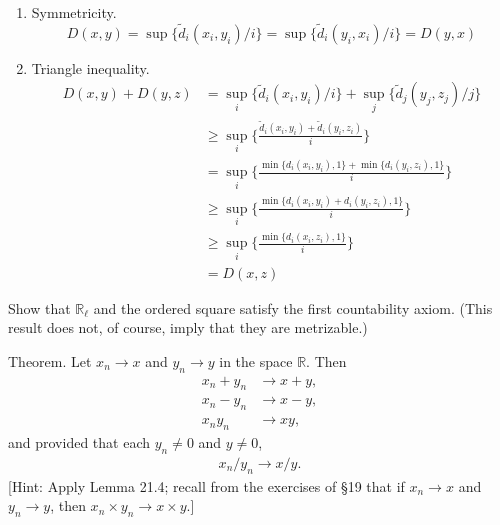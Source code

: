 \begin{solution}
\begin{enumerate}
    \item Symmetricity. 
      \begin{equation}
        D(x, y) = \sup\{\tilde{d}_i (x_i, y_i) / i \} = \sup\{\tilde{d}_i (y_i, x_i) / i \} = D(y, x)
      \end{equation}

    \item Triangle inequality. 
      \begin{align}
        D(x, y) + D(y, z) & = \sup_i \{\tilde{d}_i (x_i, y_i) / i \} + \sup_j \{\tilde{d}_j (y_j, z_j) / j \} \\
                          & \geq \sup_i \bigg\{ \frac{\tilde{d}_i (x_i, y_i) + \tilde{d}_i (y_i, z_i)}{i} \bigg\} \\
                          & = \sup_i \bigg\{ \frac{ \min\{d_i (x_i, y_i), 1\} + \min\{ d_i (y_i, z_i), 1\}}{i} \bigg\} \\
                          & \geq \sup_i \bigg\{ \frac{ \min\{d_i (x_i, y_i) + d_i (y_i, z_i), 1\}}{i} \bigg\} \\ 
                          & \geq \sup_i \bigg\{ \frac{ \min\{d_i (x_i, z_i), 1\}}{i} \bigg\} \\ 
                          & = D(x, z)
      \end{align}
  \end{enumerate}
\end{solution}

\begin{exercise}[Munkres 21.4]
  Show that $\mathbb{R}_\ell$ and the ordered square satisfy the first countability axiom. (This result does not, of course, imply that they are metrizable.)
\end{exercise}

\begin{exercise}[Munkres 21.5]
  Theorem. Let $x_n \to x$ and $y_n \to y$ in the space $\mathbb{R}$. Then
  \begin{align*}
    x_n + y_n &\to x + y, \\
    x_n - y_n &\to x - y, \\
    x_ny_n &\to xy,
  \end{align*}
  and provided that each $y_n \neq 0$ and $y \neq 0$,
  \begin{align*}
    x_n/y_n \to x/y.
  \end{align*}
  [Hint: Apply Lemma 21.4; recall from the exercises of \S19 that if $x_n \to x$ and $y_n \to y$, then $x_n \times y_n \to x \times y$.]
\end{exercise}

